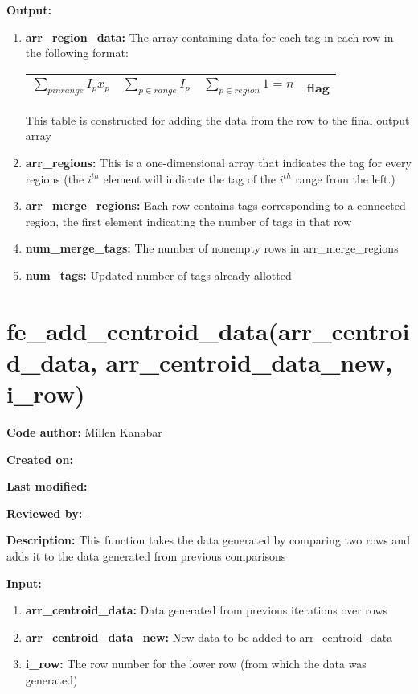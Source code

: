 \documentclass[a4paper, oneside,11pt]{article}
\begin{document}
\textbf{Output:}
\begin{enumerate}
    \item \textbf{arr\_region\_data:} The array containing data for each tag in each row in the following format:
    
    \begin{tabular}{|c|c|c|c|}
        \hline
        $ \sum_{p in range} I_p x_p $ & $\sum_{p \in range} I_p $ & $\sum_{p \in region} 1 = n $ & flag \\
        \hline
    \end{tabular}

    This table is constructed for adding the data from the row to the final output array
    
    \item \textbf{arr\_regions:} This is a one-dimensional array that indicates the tag for every regions (the $ i^{th} $ element will indicate the tag of the $ i^{th} $ range from the left.)

    \item  \textbf{arr\_merge\_regions:} Each row contains tags corresponding to a connected region, the first element indicating the number of tags in that row
    
    \item \textbf{num\_merge\_tags:} The number of nonempty rows in arr\_merge\_regions
    
    \item \textbf{num\_tags:} Updated number of tags already allotted
\end{enumerate}

\section*{fe\_add\_centroid\_data(arr\_centroid\_data, arr\_centroid\_data\_new, i\_row)}
\textbf{Code author:} Millen Kanabar


\textbf{Created on:}


\textbf{Last modified:}


\textbf{Reviewed by:} -
    
\textbf{Description:}
    This function takes the data generated by comparing two rows and adds it to the data generated from previous comparisons
    
\textbf{Input:}
\begin{enumerate}
    \item \textbf{arr\_centroid\_data:} Data generated from previous iterations over rows
    \item \textbf{arr\_centroid\_data\_new:} New data to be added to arr\_centroid\_data
    \item \textbf{i\_row:} The row number for the lower row (from which the data was generated)
\end{enumerate}
\end{document}
